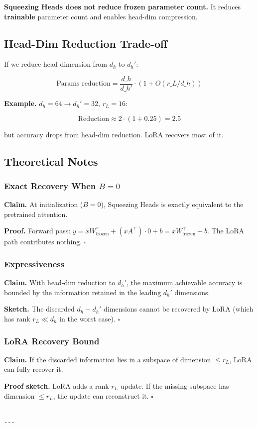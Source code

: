 \textbf{Squeezing Heads does not reduce frozen parameter count.} It reduces 
\textbf{trainable} parameter count and enables head-dim compression.

\subsection{Head-Dim Reduction Trade-off}

If we reduce head dimension from $d_h$ to $d_h'$:

\[
\text{Params reduction} = \frac{d\_h}{d\_h'} \cdot \left(1 + O(r\_L / d\_h)\right)
\]

\textbf{Example.} $d_h = 64 \to d_h' = 32$, $r_L = 16$:

\[
\text{Reduction} \approx 2 \cdot (1 + 0.25) = 2.5
\]

but accuracy drops from head-dim reduction. LoRA recovers most of it.

\subsection{Theoretical Notes}

\subsubsection{Exact Recovery When $B = 0$}

\textbf{Claim.} At initialization ($B = 0$), Squeezing Heads is exactly 
equivalent to the pretrained attention.

\textbf{Proof.} Forward pass: $y = x W_\text{frozen}^\top + (x A^\top) \cdot 0 + b = x W_\text{frozen}^\top + b$. The LoRA path contributes nothing. $\square$

\subsubsection{Expressiveness}

\textbf{Claim.} With head-dim reduction to $d_h'$, the maximum achievable 
accuracy is bounded by the information retained in the leading $d_h'$ 
dimensions.

\textbf{Sketch.} The discarded $d_h - d_h'$ dimensions cannot be recovered by 
LoRA (which has rank $r_L \ll d_h$ in the worst case). $\square$

\subsubsection{LoRA Recovery Bound}

\textbf{Claim.} If the discarded information lies in a subspace of dimension 
$\leq r_L$, LoRA can fully recover it.

\textbf{Proof sketch.} LoRA adds a rank-$r_L$ update. If the missing subspace 
has dimension $\leq r_L$, the update can reconstruct it. $\square$
\begin{lstlisting}

---
\end{lstlisting}